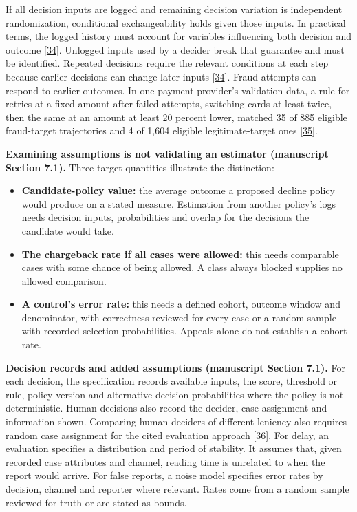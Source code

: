 \documentclass[
  11pt,
]{article}
\providecommand{\tightlist}{%
  \setlength{\itemsep}{0pt}\setlength{\parskip}{0pt}}
\renewcommand{\tightlist}{\setlength{\itemsep}{0pt plus 1pt}\setlength{\parskip}{0pt}}
\begin{document}
If all decision inputs are logged and remaining decision variation is
independent randomization, conditional exchangeability holds given those
inputs. In practical terms, the logged history must account for
variables influencing both decision and outcome
{[}\protect\hyperlink{ref-HernanRobins2020}{34}{]}. Unlogged inputs used
by a decider break that guarantee and must be identified. Repeated
decisions require the relevant conditions at each step because earlier
decisions can change later inputs
{[}\protect\hyperlink{ref-HernanRobins2020}{34}{]}. Fraud attempts can
respond to earlier outcomes. In one payment provider's validation data,
a rule for retries at a fixed amount after failed attempts, switching
cards at least twice, then the same at an amount at least 20 percent
lower, matched 35 of 885 eligible fraud-target trajectories and 4 of
1,604 eligible legitimate-target ones
{[}\protect\hyperlink{ref-He2026PaySeqGen}{35}{]}.

\textbf{Examining assumptions is not validating an estimator (manuscript
Section 7.1).} Three target quantities illustrate the distinction:

\begin{itemize}
\tightlist
\item
  \textbf{Candidate-policy value:} the average outcome a proposed
  decline policy would produce on a stated measure. Estimation from
  another policy's logs needs decision inputs, probabilities and overlap
  for the decisions the candidate would take.
\item
  \textbf{The chargeback rate if all cases were allowed:} this needs
  comparable cases with some chance of being allowed. A class always
  blocked supplies no allowed comparison.
\item
  \textbf{A control's error rate:} this needs a defined cohort, outcome
  window and denominator, with correctness reviewed for every case or a
  random sample with recorded selection probabilities. Appeals alone do
  not establish a cohort rate.
\end{itemize}

\textbf{Decision records and added assumptions (manuscript Section
7.1).} For each decision, the specification records available inputs,
the score, threshold or rule, policy version and alternative-decision
probabilities where the policy is not deterministic. Human decisions
also record the decider, case assignment and information shown.
Comparing human deciders of different leniency also requires random case
assignment for the cited evaluation approach
{[}\protect\hyperlink{ref-Lakkaraju2017Selective}{36}{]}. For delay, an
evaluation specifies a distribution and period of stability. It assumes
that, given recorded case attributes and channel, reading time is
unrelated to when the report would arrive. For false reports, a noise
model specifies error rates by decision, channel and reporter where
relevant. Rates come from a random sample reviewed for truth or are
stated as bounds.
\end{document}
